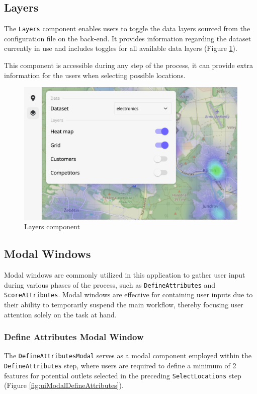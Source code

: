 \subsection{Layers}

The \texttt{Layers} component enables users to toggle the data layers sourced from the configuration file on the back-end. It provides information regarding the dataset currently in use and includes toggles for all available data layers (Figure \ref{fig:ui-layers}).

This component is accessible during any step of the process, it can provide extra information for the users when selecting possible locations.

\begin{figure}[ht]\centering
  \centering
  \includegraphics[width=0.8\linewidth]{obrazky-figures/ch6/layers.png}
  \caption{Layers component}
  \label{fig:ui-layers}
\end{figure}

\subsection{Modal Windows}

Modal windows are commonly utilized in this application to gather user input during various phases of the process, such as \texttt{DefineAttributes} and \texttt{ScoreAttributes}. Modal windows are effective for containing user inputs due to their ability to temporarily suspend the main workflow, thereby focusing user attention solely on the task at hand.

\subsubsection{Define Attributes Modal Window}

The \texttt{DefineAttributesModal} serves as a modal component employed within the\\ \texttt{DefineAttributes} step, where users are required to define a minimum of 2 features for potential outlets selected in the preceding \texttt{SelectLocations} step (Figure \ref{fig:uiModalDefineAttributes}). 

